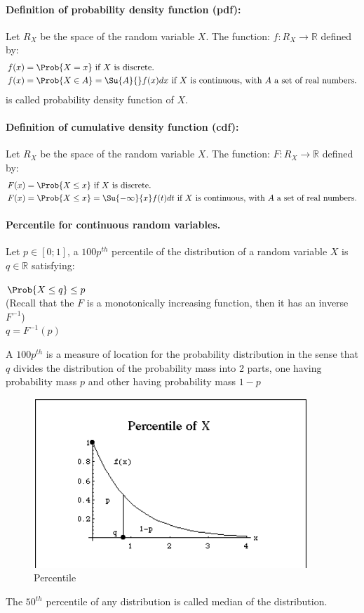 \paragraph{Definition of probability density function (pdf):}
Let $R_{X}$ be the space of the random variable $X$. The function:
$f:R_{X}\rightarrow \mathbb{R}$ defined by:
\begin{align*}
    f(x) &= \Prob{X=x} \text{ if } X \text{ is discrete.}\\
    f(x) &= \Prob{X\in A}=\Su{A}{{}}f(x)dx \text{ if } X \text{ is continuous, with } A
    \text{ a set of real numbers.}
\end{align*}
is called probability density function of $X$.


\paragraph{Definition of cumulative density function (cdf):}
Let $R_{X}$ be the space of the random variable $X$. The function:
$F:R_{X}\rightarrow \mathbb{R}$ defined by:\\
\begin{align*}
    F(x) &= \Prob{X\leq x} \text{ if } X \text{ is discrete.}\\
    F(x) &= \Prob{X\leq x}=\Su{-\infty}{x}f(t)dt \text{ if } X \text{ is continuous, 
    with } A \text{ a set of real numbers.}
\end{align*}


\paragraph{Percentile for continuous random variables.}
Let $p\in [0;1]$, a $100p^{th}$ percentile of the distribution of a random
variable $X$ is $q\in\mathbb{R}$ satisfying:
\begin{center}
	$\Prob{X\leq q}\leq p$\\
	(Recall that the $F$ is a monotonically increasing function, then it has an 
	inverse $F^{-1}$)\\
	$q = F^{-1}(p)$
\end{center}
A $100p^{th}$ is a measure of location for the probability distribution in
the sense that $q$ divides the distribution of the probability mass into
2 parts, one having probability mass $p$ and other having probability mass
$1-p$
\begin{figure}[H]
	\begin{center}
		\includegraphics[width=.5\textwidth]{./chapters/2_statistics/01_fundamental_probability_concepts/2_images/1percentile.png}
	\end{center}
	\caption{Percentile}
	\label{fig:fig2.1}
\end{figure}
The $50^{th}$ percentile of any distribution is called median of the distribution.
